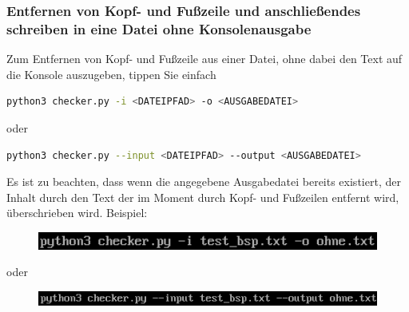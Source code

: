 \documentclass[12pt]{scrartcl}
\begin{document}
\subsubsection{Entfernen von Kopf- und Fußzeile und anschließendes schreiben in eine Datei ohne Konsolenausgabe}
\label{sec:first-steps-extraction-file-without}
Zum Entfernen von Kopf- und Fußzeile aus einer Datei, ohne dabei den Text auf die Konsole auszugeben, tippen Sie einfach 
\begin{lstlisting}[language=bash]
python3 checker.py -i <DATEIPFAD> -o <AUSGABEDATEI>
\end{lstlisting}
\begin{center}
oder
\end{center}
\begin{lstlisting}[language=bash]
python3 checker.py --input <DATEIPFAD> --output <AUSGABEDATEI>
\end{lstlisting} 
Es ist zu beachten, dass wenn die angegebene Ausgabedatei bereits existiert, der Inhalt durch den Text der im Moment durch Kopf- und Fußzeilen entfernt wird, überschrieben wird. 
Beispiel:
\begin{figure}[htbp]\includegraphics[width=1.0\textwidth]{ersteSchritteKopfFussIntoFileWithoutConsole002}\par\vspace{0.25cm}
\label{fig:ersteSchritteKopfFussIntoFileWithoutConsole002}
\end{figure}
\begin{center}
oder
\end{center}
\begin{figure}[htbp]
\includegraphics[width=1.0\textwidth]{ersteSchritteKopfFussIntoFileWithoutConsole001}\par
\vspace{0.25cm}
\label{fig:ersteSchritteKopfFussIntoFileWithoutConsole001}
\end{figure}
\begin{figure}[htbp]
\centering
\label{fig:ersteSchritteExtractIntoFileWithoutConsole003}
\end{figure}
\newpage
\end{document}
